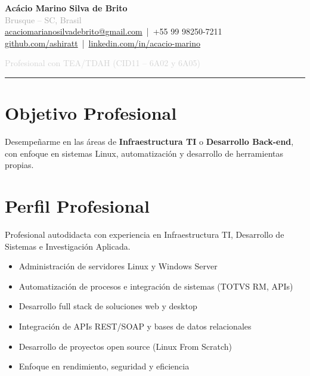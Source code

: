 \documentclass[11pt,a4paper]{article}
\begin{document}
\begin{center}
    {\LARGE\textbf{Acácio Marino Silva de Brito}}\\[6pt]
    
    {\small \textcolor{darkgray}{Brusque -- SC, Brasil}}\\[4pt]
    
    \href{mailto:acaciomarianosilvadebrito@gmail.com}{acaciomarianosilvadebrito@gmail.com}
    \,|\, +55 99 98250-7211\\
    
    \href{https://github.com/ashiratt}{github.com/ashiratt}
    \,|\, 
    \href{https://linkedin.com/in/acacio-marino}{linkedin.com/in/acacio-marino}
    
    \vspace{6pt}
    {\footnotesize \textcolor{lightgray}{Profesional con TEA/TDAH (CID11 – 6A02 y 6A05)}}
\end{center}

\vspace{6pt}
\hrule
\vspace{10pt}

\section{Objetivo Profesional}
Desempeñarme en las áreas de \textbf{Infraestructura TI} o \textbf{Desarrollo Back-end}, con enfoque en sistemas Linux, automatización y desarrollo de herramientas propias.

\section{Perfil Profesional}
Profesional autodidacta con experiencia en Infraestructura TI, Desarrollo de Sistemas e Investigación Aplicada.

\begin{itemize}
    \item Administración de servidores Linux y Windows Server
    \item Automatización de procesos e integración de sistemas (TOTVS RM, APIs)
    \item Desarrollo full stack de soluciones web y desktop
    \item Integración de APIs REST/SOAP y bases de datos relacionales
    \item Desarrollo de proyectos open source (Linux From Scratch)
    \item Enfoque en rendimiento, seguridad y eficiencia
\end{itemize}
\end{document}
